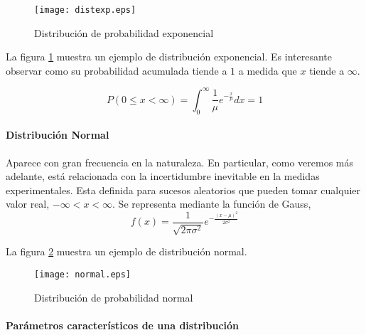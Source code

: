 \begin{figure}
\centering
\texttt{[image: distexp.eps]}
\caption{Distribución de probabilidad exponencial}
\label{fig:distexp}
\end{figure}

La figura \ref{fig:distexp} muestra un ejemplo de distribución exponencial. Es interesante observar como su probabilidad acumulada tiende a $1$ a medida que $x$ tiende a $\infty$.

\begin{equation*}
P(0\leqslant x < \infty) = \int_0^{\infty}\frac{1}{\mu}e^{-\frac{x}{\mu}}dx = 1
\end{equation*}

\paragraph{Distribución Normal} Aparece con gran frecuencia en la naturaleza. En particular, como veremos más adelante, está relacionada con la incertidumbre inevitable en la medidas experimentales. Esta definida para sucesos aleatorios que pueden tomar cualquier valor real, $-\infty < x < \infty$. Se representa mediante la función de Gauss,
\begin{equation*}
f(x)=\frac{1}{\sqrt{2\pi\sigma^2}}e^{-\frac{(x-\mu)^2}{2\sigma^2}}
\end{equation*}

La figura \ref{fig:normal} muestra un ejemplo de distribución normal.
\begin{figure}
\centering
\texttt{[image: normal.eps]}
\caption{Distribución de probabilidad normal}
\label{fig:normal}
\end{figure}

\paragraph{Parámetros característicos de una distribución}

